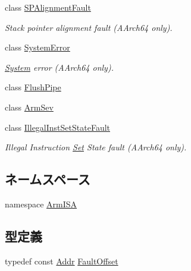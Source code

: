 \begin{DoxyCompactItemize}
class \hyperlink{classArmISA_1_1SPAlignmentFault}{SPAlignmentFault}
\begin{DoxyCompactList}\small\item\em Stack pointer alignment fault (AArch64 only). \item\end{DoxyCompactList}\item 
class \hyperlink{classArmISA_1_1SystemError}{SystemError}
\begin{DoxyCompactList}\small\item\em \hyperlink{classSystem}{System} error (AArch64 only). \item\end{DoxyCompactList}\item 
class \hyperlink{classArmISA_1_1FlushPipe}{FlushPipe}
\item 
class \hyperlink{classArmISA_1_1ArmSev}{ArmSev}
\item 
class \hyperlink{classArmISA_1_1IllegalInstSetStateFault}{IllegalInstSetStateFault}
\begin{DoxyCompactList}\small\item\em Illegal Instruction \hyperlink{classSet}{Set} State fault (AArch64 only). \item\end{DoxyCompactList}\end{DoxyCompactItemize}
\subsection*{ネームスペース}
\begin{DoxyCompactItemize}
\item 
namespace \hyperlink{namespaceArmISA}{ArmISA}
\end{DoxyCompactItemize}
\subsection*{型定義}
\begin{DoxyCompactItemize}
\item 
typedef const \hyperlink{classm5_1_1params_1_1Addr}{Addr} \hyperlink{namespaceArmISA_a263b69e0840c906ca5589c8376659c07}{FaultOffset}
\end{DoxyCompactItemize}

